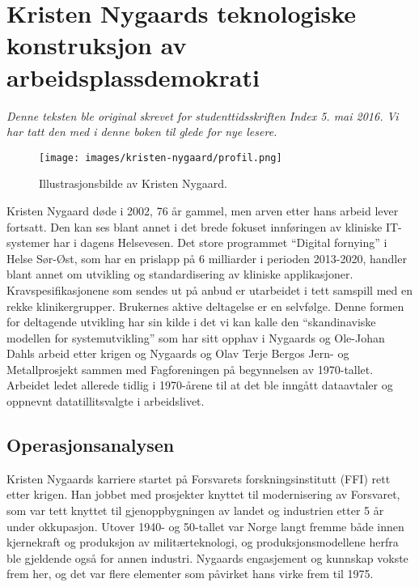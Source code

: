 \chapter[Kristen Nygaard]{Kristen Nygaards teknologiske konstruksjon av arbeidsplassdemokrati}

\author{Skrevet av Egil Øvrelid}

\emph{Denne teksten ble original skrevet for studenttidsskriften Index 5. mai 2016. Vi har tatt den med i denne boken til glede for nye lesere.}

\begin{wrapfigure}{r}{6cm}
	\centering
	\texttt{[image: images/kristen-nygaard/profil.png]}
	\label{fig:kristen-nygaard}
	\caption{Illustrasjonsbilde av Kristen Nygaard.}
\end{wrapfigure}

Kristen Nygaard døde i 2002, 76 år gammel, men arven etter hans arbeid lever fortsatt. Den kan ses blant annet i det brede fokuset innføringen av kliniske IT-systemer har i dagens Helsevesen. Det store programmet ``Digital fornying'' i Helse Sør-Øst, som har en prislapp på 6 milliarder i perioden 2013-2020, handler blant annet om utvikling og standardisering av kliniske applikasjoner. Kravspesifikasjonene som sendes ut på anbud er utarbeidet i tett samspill med en rekke klinikergrupper. Brukernes aktive deltagelse er en selvfølge. Denne formen for deltagende utvikling har sin kilde i det vi kan kalle den ``skandinaviske modellen for systemutvikling'' som har sitt opphav i Nygaards og Ole-Johan Dahls arbeid etter krigen og Nygaards og Olav Terje Bergos Jern- og Metallprosjekt sammen med Fagforeningen på begynnelsen av 1970-tallet. Arbeidet ledet allerede tidlig i 1970-årene til at det ble inngått dataavtaler og oppnevnt datatillitsvalgte i arbeidslivet.

\section{Operasjonsanalysen}

Kristen Nygaards karriere startet på Forsvarets forskningsinstitutt (FFI) rett etter krigen. Han jobbet med prosjekter knyttet til modernisering av Forsvaret, som var tett knyttet til gjenoppbygningen av landet og industrien etter 5 år under okkupasjon. Utover 1940- og 50-tallet var Norge langt fremme både innen kjernekraft og produksjon av militærteknologi, og produksjonsmodellene herfra ble gjeldende også for annen industri. Nygaards engasjement og kunnskap vokste frem her, og det var flere elementer som påvirket hans virke frem til 1975.

